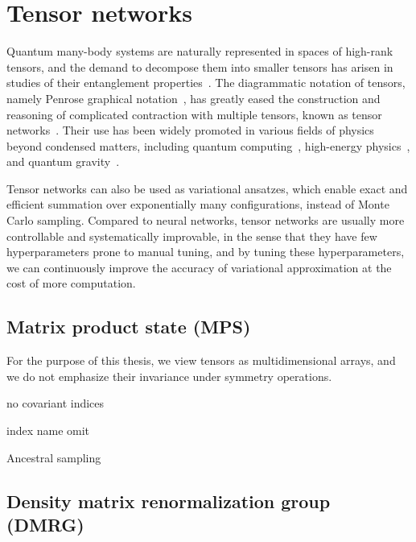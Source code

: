 \chapter{Tensor networks}
\label{ch:tn}

Quantum many-body systems are naturally represented in spaces of high-rank tensors, and the demand to decompose them into smaller tensors has arisen in studies of their entanglement properties~\cite{white1992density}. The diagrammatic notation of tensors, namely Penrose graphical notation~\cite{penrose1971applications}, has greatly eased the construction and reasoning of complicated contraction with multiple tensors, known as tensor networks~\cite{bridgeman2017hand, orus2014practical}. Their use has been widely promoted in various fields of physics beyond condensed matters, including quantum computing~\cite{feynman1986quantum, nielsen2010quantum}, high-energy physics~\cite{banuls2018tensor, banuls2020review}, and quantum gravity~\cite{perez2013spin, you2016entanglement, hayden2016holographic, asaduzzaman2020tensor}.

Tensor networks can also be used as variational ansatzes, which enable exact and efficient summation over exponentially many configurations, instead of Monte Carlo sampling. Compared to neural networks, tensor networks are usually more controllable and systematically improvable, in the sense that they have few hyperparameters prone to manual tuning, and by tuning these hyperparameters, we can continuously improve the accuracy of variational approximation at the cost of more computation.

\section{Matrix product state (MPS)}

For the purpose of this thesis, we view tensors as multidimensional arrays, and we do not emphasize their invariance under symmetry operations.






no covariant indices

index name omit

Ancestral sampling~\cite{wei2022sequential}

\section{Density matrix renormalization group (DMRG)}

